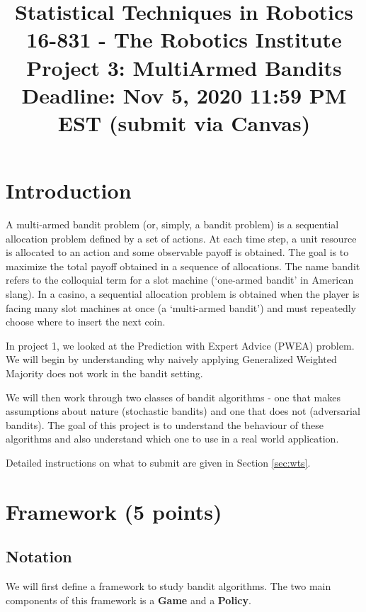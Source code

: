 \documentclass{article}
\title
{ 
{\small Statistical Techniques in Robotics 16-831 - The Robotics Institute} 
\\ 
\vspace{5mm}
Project 3: MultiArmed Bandits
{\large \\Deadline: Nov 5, 2020 11:59 PM EST (submit via Canvas)}
}
\date{}
\begin{document}
\maketitle

\section{Introduction}
A multi-armed bandit problem (or, simply, a bandit problem) \cite{bubeck_bandit2012} is a sequential allocation problem defined by a set of actions. At each time step, a unit resource is allocated to an action and some observable payoff is obtained. The goal is to maximize the total payoff obtained in a sequence of allocations. The name bandit refers to the colloquial term for a slot machine (`one-armed bandit' in American slang). In a casino, a sequential allocation problem is obtained when the player is facing many slot machines at once (a `multi-armed bandit') and must repeatedly choose where to insert the next coin.

In project 1, we looked at the Prediction with Expert Advice (PWEA) problem. We will begin by understanding why naively applying Generalized Weighted Majority does not work in the bandit setting.

We will then work through two classes of bandit algorithms - one that makes assumptions about nature (stochastic bandits) and one that does not (adversarial bandits). The goal of this project is to understand the behaviour of these algorithms and also understand which one to use in a real world application.

Detailed instructions on what to submit are given in Section \ref{sec:wts}. 


\section{Framework (5 points)}
\subsection{Notation}

We will first define a framework to study bandit algorithms. The two main components of this framework is a \textbf{Game} and a \textbf{Policy}.
\end{document}
